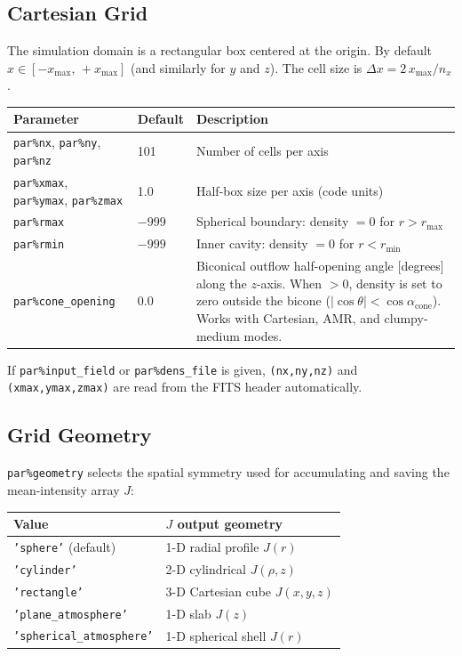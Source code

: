 \documentclass[english,a4paper]{my_memo}
\newcommand{\parm}[1]{\texttt{par\%#1}}
\begin{document}
\subsection{Cartesian Grid}

The simulation domain is a rectangular box centered at the origin.  By default
$x \in [-x_\text{max},\,+x_\text{max}]$ (and similarly for $y$ and $z$).
The cell size is $\Delta x = 2\,x_\text{max}/n_x$.

\begin{center}
\begin{tabular}{@{}l@{\hspace{1.5em}}l@{\hspace{1.5em}}l@{}}
\toprule
Parameter & Default & Description \\
\midrule
\parm{nx}, \parm{ny}, \parm{nz} & 101 & Number of cells per axis \\
\parm{xmax}, \parm{ymax}, \parm{zmax} & 1.0 & Half-box size per axis (code units) \\
\parm{rmax} & $-999$ & Spherical boundary: density $= 0$ for $r > r_\text{max}$ \\
\parm{rmin} & $-999$ & Inner cavity: density $= 0$ for $r < r_\text{min}$ \\
\parm{cone\_opening} & 0.0 & Biconical outflow half-opening angle [degrees] along the $z$-axis. When $>0$, density is set to zero outside the bicone ($|\cos\theta| < \cos\alpha_\mathrm{cone}$). Works with Cartesian, AMR, and clumpy-medium modes. \\
\bottomrule
\end{tabular}
\end{center}

If \parm{input\_field} or \parm{dens\_file} is given, \texttt{(nx,ny,nz)} and
\texttt{(xmax,ymax,zmax)} are read from the FITS header automatically.

\subsection{Grid Geometry}
\label{sec:geometry}

\parm{geometry} selects the spatial symmetry used for accumulating and saving the
mean-intensity array $J$:

\begin{center}
\begin{tabular}{ll}
\toprule
Value & $J$ output geometry \\
\midrule
\texttt{'sphere'} (default) & 1-D radial profile $J(r)$ \\
\texttt{'cylinder'} & 2-D cylindrical $J(\rho,z)$ \\
\texttt{'rectangle'} & 3-D Cartesian cube $J(x,y,z)$ \\
\texttt{'plane\_atmosphere'} & 1-D slab $J(z)$ \\
\texttt{'spherical\_atmosphere'} & 1-D spherical shell $J(r)$ \\
\bottomrule
\end{tabular}
\end{center}
\end{document}
